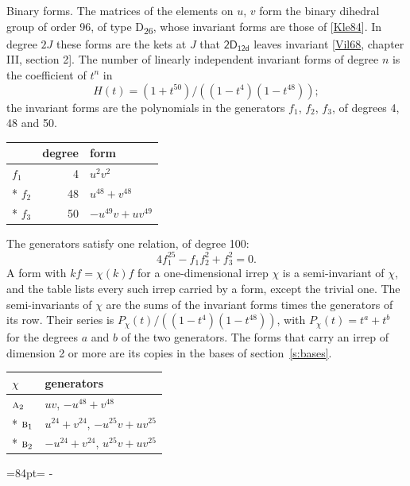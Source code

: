 \documentclass[10pt,a4paper]{article}
\makeatletter
\renewcommand\paragraph{\@startsection{paragraph}{4}{\z@}{1.5ex plus .5ex minus .2ex}{-1em}%
  {\normalfont\small\sffamily\bfseries\color{parttitle}}}
\newcommand{\needspace}[1]{\par\penalty-100\begingroup\dimen0=#1\relax\dimen2=\pagegoal
  \advance\dimen2-\pagetotal\ifdim\dimen0>\dimen2\relax\ifdim\dimen2>0pt\vfil\break\fi\fi
  \endgroup}
\numberwithin{equation}{section}
\newcommand{\grp}[1]{\mathsf{#1}}
\newcommand{\irr}[1]{\text{\normalfont\scshape #1}}
\makeatother
\begin{document}
\paragraph{Binary forms.}
The matrices of the elements on $u$, $v$ form the binary dihedral group of order 96, of type D\textsubscript{26}, whose invariant forms are those of [\href{../../../REFERENCES.pdf\#ref.Kle84}{Kle84}]. In degree $2J$ these forms are the kets at $J$ that $\grp{2D_{12d}}$ leaves invariant [\href{../../../REFERENCES.pdf\#ref.Vil68}{Vil68}, chapter III, section 2]. \label{n:head.degree}\label{n:head.form}The number of linearly independent invariant forms of degree $n$ is the coefficient of $t^n$ in
\begin{equation}\label{e:molien}H(t) = (1 + t^{50})/((1-t^{4})(1-t^{48}));\end{equation}
the invariant forms are the polynomials in the generators $f_1$, $f_2$, $f_3$, of degrees 4, 48 and 50.
{\small\begin{longtable}{@{}lrl@{}}\toprule
& degree & form\\\midrule\endhead
\bottomrule\endfoot\endlastfoot
$f_{1}$ & 4 & $u^{2}v^{2}$\\*
$f_{2}$ & 48 & $u^{48} + v^{48}$\\*
$f_{3}$ & 50 & $-u^{49}v + uv^{49}$\\
\bottomrule\end{longtable}}
The generators satisfy one relation, of degree 100:
\begin{equation}\label{e:relation}4f_{1}^{25} - f_{1}f_{2}^{2} + f_{3}^{2} = 0.\end{equation}
A form with $k f = \chi(k) f$ for a one-dimensional irrep $\chi$ is a semi-invariant of $\chi$, and the table lists every such irrep carried by a form, except the trivial one. \label{n:head.generators}The semi-invariants of $\chi$ are the sums of the invariant forms times the generators of its row. Their series is $P_\chi(t)/((1-t^{4})(1-t^{48}))$, with $P_\chi(t) = t^{a} + t^{b}$ for the degrees $a$ and $b$ of the two generators. The forms that carry an irrep of dimension 2 or more are its copies in the bases of section~\ref{s:bases}.
{\small\begin{longtable}{@{}ll@{}}\toprule
$\chi$ & generators\\\midrule\endhead
\bottomrule\endfoot\endlastfoot
$\irr{a}_{2}$ & $uv$, $-u^{48} + v^{48}$\\*
$\irr{b}_{1}$ & $u^{24} + v^{24}$, $-u^{25}v + uv^{25}$\\*
$\irr{b}_{2}$ & $-u^{24} + v^{24}$, $u^{25}v + uv^{25}$\\
\bottomrule\end{longtable}}
\needspace{84pt}
\end{document}
